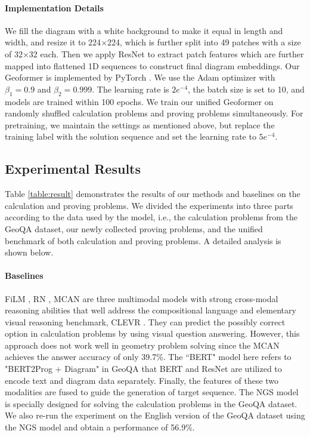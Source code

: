 \documentclass[11pt]{article}
\begin{document}
\paragraph{Implementation Details}
We fill the diagram with a white background to make it equal in length and width, and resize it to 224$\times$224, which is further split into 49 patches with a size of 32$\times$32 each.
Then we apply ResNet \cite{he2016deep} to extract patch features which are further mapped into flattened 1D sequences to construct final diagram embeddings. 
Our Geoformer is implemented by PyTorch \cite{paszke2017automatic}. We use the Adam \cite{loshchilov2017decoupled} optimizer with $\beta_1=0.9$ and $\beta_2=0.999$.
The learning rate is $2e^{-4}$, the batch size is set to 10, and models are trained within 100 epochs.
We train our unified Geoformer on randomly shuffled calculation problems and proving problems simultaneously.
For pretraining, we maintain the settings as mentioned above, but replace the training label with the solution sequence and set the learning rate to $5e^{-4}$.



\subsection{Experimental Results}
Table \ref{table:result} demonstrates the results of our methods and baselines on the calculation and proving problems. We divided the experiments into three parts according to the data used by the model, i.e., the calculation problems from the GeoQA dataset, our newly collected proving problems, and the unified benchmark of both calculation and proving problems. A detailed analysis is shown below.

\paragraph{Baselines}
FiLM \cite{perez2017film}, RN \cite{santoro2017simple}, MCAN \cite{yu2019deep} are three multimodal models with strong cross-modal reasoning abilities that well address the compositional language and elementary visual reasoning benchmark, CLEVR \cite{johnson2017clevr}. They can predict the possibly correct option in calculation problems by using visual question answering. However, this approach does not work well in geometry problem solving since the MCAN achieves the answer accuracy of only 39.7\%.
The ``BERT" model here refers to "BERT2Prog + Diagram" in GeoQA that BERT and ResNet are utilized to encode text and diagram data separately. Finally, the features of these two modalities are fused to guide the generation of target sequence.
The NGS model is specially designed for solving the calculation problems in the GeoQA dataset.
We also re-run the experiment on the English version of the GeoQA dataset using the NGS model and obtain a performance of 56.9\%.
\end{document}
